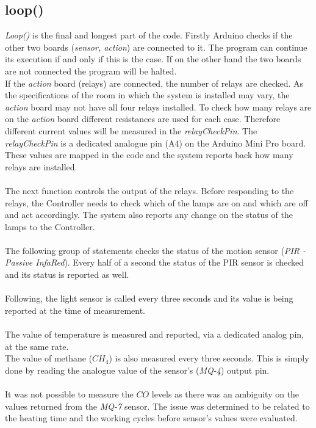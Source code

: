 \documentclass[12pt,a4paper,draft]{report}
\begin{document}
\subsection{loop()}
\textit{Loop()} is the final and longest part of the code.
Firstly Arduino checks if the other two boards (\textit{sensor, action}) are connected to it.
The program can continue its execution if and only if this is the case.
If on the other hand the two boards are not connected the program will be halted.
\ \\
If the \textit{action} board (relays) are connected, the number of relays are checked.
As the specifications of the room in which the system is installed may vary, the \textit{action} board may not have all four relays installed.
To check how many relays are on the \textit{action} board different resistances are used for each case.
Therefore different current values will be measured in the \textit{relayCheckPin}. 
The \textit{relayCheckPin} is a dedicated analogue pin (A4) on the Arduino Mini Pro board. %
These values are mapped in the code and the system reports back how many relays are installed.\\
\ \\
The next function controls the output of the relays.
Before responding to the relays, the Controller needs to check which of the lamps are on and which are off and act accordingly.
The system also reports any change on the status of the lamps to the Controller. \\
\ \\
The following group of statements checks the status of the motion sensor (\textit{PIR - Passive InfaRed}).
Every half of a second the status of the PIR sensor is checked and its status is reported as well.\\
\ \\
Following, the light sensor is called every three seconds and its value is being reported at the time of measurement.\\
\ \\
The value of temperature is measured and reported, via a dedicated analog pin, at the same rate.
\ \\
The value of methane ($CH_4$) is also measured every three seconds.
This is simply done by reading the analogue value of the sensor's (\textit{MQ-4}) output pin.\\
\ \\
It was not possible to measure the $CO$ levels as there was an ambiguity on the values returned from the \textit{MQ-7} sensor.
The issue was determined to be related to the heating time and the working cycles before sensor's values were evaluated.\\
\ \\
%
\end{document}
